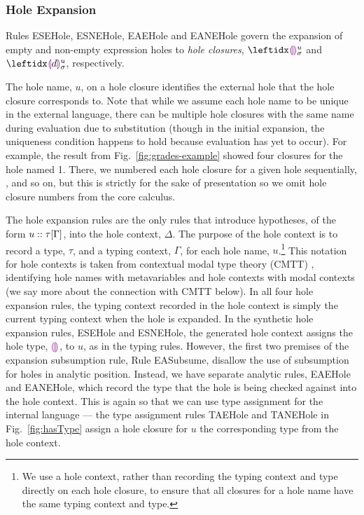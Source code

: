 \subsubsection{Hole Expansion}\label{sec:hole-expansion} Rules {ESEHole}, {ESNEHole}, {EAEHole} and {EANEHole} govern the expansion of empty and non-empty expression holes to \emph{hole closures}, $\dehole{u}{\sigma}{}$ and $\dhole{\dexp}{u}{\sigma}{}$, respectively. 

The hole name, $u$, on a hole closure identifies the external hole that the hole closure corresponds to. Note that while we assume each hole name to be unique in the external language, there can be multiple hole closures with the same name during evaluation due to substitution (though in the initial expansion, the uniqueness condition happens to hold because evaluation has yet to occur). For example, the result from Fig.~\ref{fig:grades-example} showed four closures for the hole named 1. There, we numbered each hole closure for a given hole sequentially, ,  and so on, but this is strictly for the sake of presentation so we omit hole closure numbers from the core calculus.

The hole expansion rules are the only rules that introduce hypotheses, of the form $u :: \tau[\Gamma]$, into the hole context, $\Delta$. The purpose of the hole context is to record a type, $\tau$, and a typing context, $\Gamma$,   for each hole name, $u$.\footnote{We use a hole context, rather than recording the typing context and type directly on each hole closure, to ensure that all closures for a hole name have the same typing context and type.} This notation for hole contexts is taken from contextual modal type theory (CMTT) \cite{Nanevski2008}, identifying hole names with metavariables and hole contexts with modal contexts (we say more about the connection with CMTT below). In all four hole expansion rules, the typing context recorded in the hole context is simply the current typing context when the hole is expanded. In the synthetic hole expansion rules, {ESEHole} and {ESNEHole}, the generated hole context assigns the hole type, $\textcolor{violet}{\llparenthesis}\textcolor{violet}{\rrparenthesis}$, to $u$, as in the typing rules. However, the first two premises of the expansion subsumption rule, Rule EASubsume, disallow the use of subsumption for holes in analytic position. Instead, we have separate analytic rules, {EAEHole} and {EANEHole}, which record the type that the hole is being checked against into the hole context. This is again so that we can use type assignment for the internal language --- the type assignment rules TAEHole and TANEHole in Fig.~\ref{fig:hasType} assign a hole closure for $u$ the corresponding type from the hole context.

